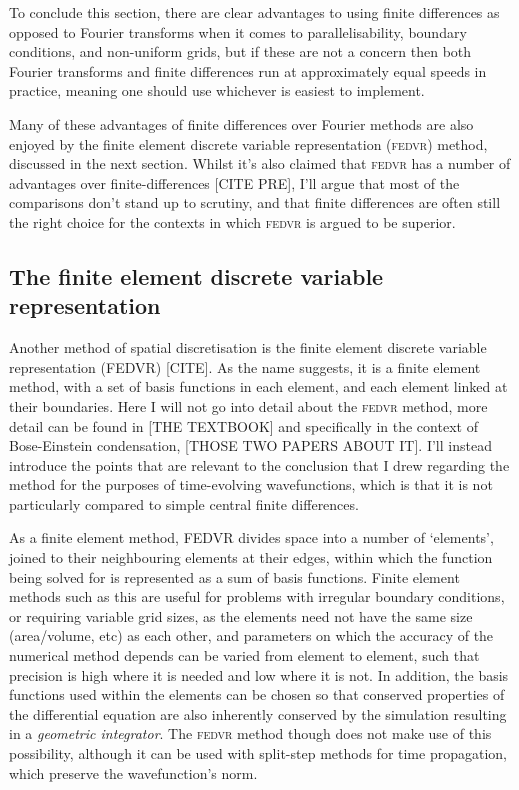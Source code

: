 To conclude this section, there are clear advantages to using finite differences as opposed to Fourier transforms when it comes to parallelisability, boundary conditions, and non-uniform grids, but if these are not a concern then both Fourier transforms and finite differences run at approximately equal speeds in practice, meaning one should use whichever is easiest to implement.

Many of these advantages of finite differences over Fourier methods are also enjoyed by the finite element discrete variable representation (\textsc{fedvr}) method, discussed in the next section. Whilst it's also claimed that \textsc{fedvr} has a number of advantages over finite-differences [CITE PRE], I'll argue that most of the comparisons don't stand up to scrutiny, and that finite differences are often still the right choice for the contexts in which \textsc{fedvr} is argued to be superior.

\subsection{The finite element discrete variable representation}

Another method of spatial discretisation is the finite element discrete variable representation (\textsc{FEDVR}) [CITE]. As the name suggests, it is a finite element method, with a set of basis functions in each element, and each element linked at their boundaries. Here I will not go into detail about the \textsc{fedvr} method, more detail can be found in [THE TEXTBOOK] and specifically in the context of Bose-Einstein condensation, [THOSE TWO PAPERS ABOUT IT]. I'll instead introduce the points that are relevant to the conclusion that I drew regarding the method for the purposes of time-evolving wavefunctions, which is that it is not particularly compared to simple central finite differences.

As a finite element method, \textsc{FEDVR} divides space into a number of `elements', joined to their neighbouring elements at their edges, within which the function being solved for is represented as a sum of basis functions. Finite element methods such as this are useful for problems with irregular boundary conditions, or requiring variable grid sizes, as the elements need not have the same size (area/volume, etc) as each other, and parameters on which the accuracy of the numerical method depends can be varied from element to element, such that precision is high where it is needed and low where it is not. In addition, the basis functions used within the elements can be chosen so that conserved properties of the differential equation are also inherently conserved by the simulation resulting in a \emph{geometric integrator}. The \textsc{fedvr} method though does not make use of this possibility, although it can be used with split-step methods for time propagation, which preserve the wavefunction's norm.

